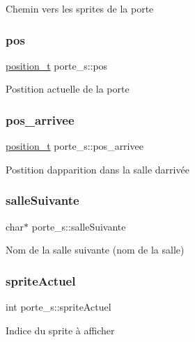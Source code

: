 Chemin vers les sprites de la porte \mbox{\label{structporte__s_a9e3c1bbfc207fb5ae26ed3c348ae9602}} 
\subsubsection{\texorpdfstring{pos}{pos}}
{\footnotesize\ttfamily \hyperlink{structposition__s}{position\+\_\+t} porte\+\_\+s\+::pos}

Postition actuelle de la porte \mbox{\label{structporte__s_a5f0b093b4c08255187a3dd261ff9e638}} 
\subsubsection{\texorpdfstring{pos\+\_\+arrivee}{pos\_arrivee}}
{\footnotesize\ttfamily \hyperlink{structposition__s}{position\+\_\+t} porte\+\_\+s\+::pos\+\_\+arrivee}

Postition d\textquotesingle{}apparition dans la salle d\textquotesingle{}arrivée \mbox{\label{structporte__s_ae89eb735de3e232b85236a603bf004d4}} 
\subsubsection{\texorpdfstring{salle\+Suivante}{salleSuivante}}
{\footnotesize\ttfamily char$\ast$ porte\+\_\+s\+::salle\+Suivante}

Nom de la salle suivante (nom de la salle) \mbox{\label{structporte__s_af7204aec8f2a5b1641986d70aa74e077}} 
\subsubsection{\texorpdfstring{sprite\+Actuel}{spriteActuel}}
{\footnotesize\ttfamily int porte\+\_\+s\+::sprite\+Actuel}

Indice du sprite à afficher \mbox{\label{structporte__s_ac2c6fbd516cc31f3b68f29541f4fff06}} 
